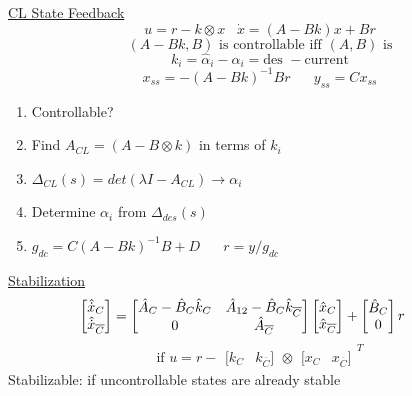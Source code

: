 \documentclass[twocolumn]{article}    %
\begin{document}
\noindent
\underline{CL State Feedback}
\begin{equation*}
    u = r - k \otimes x \hspace{10pt}  \Dot{x} = (A-Bk) x + Br
\end{equation*}
\begin{equation*}
    (A-Bk, B) \text{ is controllable iff } (A,B) \text{ is}
\end{equation*}
\begin{equation*}
    k_i = \hat{\alpha}_i - \alpha_i = \text{des }- \text{current}
\end{equation*}
\begin{equation*}
    x_{ss} = -(A-Bk)^{-1}Br \hspace{20pt} y_{ss} = Cx_{ss}
\end{equation*}
\begin{enumerate}
    \item Controllable? 
    \item Find \(A_{CL}= (A-B\otimes k)\) in terms of \(k_i\)
    \item \(\Delta_{CL}(s) = det(\lambda I-A_{CL}) \rightarrow \alpha_i\)
    \item Determine \(\alpha_i\) from \(\Delta_{des}(s)\)
    \item \(g_{dc}= C(A-Bk)^{-1}B+D \hspace{20pt} r = y/ g_{dc}\)
\end{enumerate}
\underline{Stabilization}
\begin{equation*}
    \hspace{-25pt} \begin{bmatrix}
        \hat{\Dot{x}}_C \\ \hat{\Dot{x}}_{\overline{C}} 
    \end{bmatrix} = \begin{bmatrix}
        \hat{A}_C - \hat{B}_C\hat{k}_C & \hat{A}_{12} -\hat{B}_C\hat{k}_{\overline{C}} \\
        0 & \hat{A}_{\overline{C}}
    \end{bmatrix} \begin{bmatrix}
        \hat{x}_C \\ \hat{x}_{\overline{C}} 
    \end{bmatrix} + \begin{bmatrix}
        \hat{B}_C \\ 0
    \end{bmatrix} r
\end{equation*}
\begin{equation*}
    \text{if } u = r - \begin{matrix}
        [k_C & k_{\overline{C}}]
    \end{matrix} \otimes \begin{matrix}
        [x_C & x_{\overline{C}}]
    \end{matrix}^T
\end{equation*}
Stabilizable: if uncontrollable states are already stable
\end{document}
